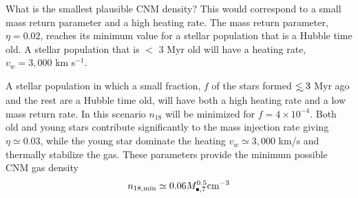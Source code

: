 \documentclass[usenatbib,fleqn]{mnras}
\newcommand\lsim{\mathrel{\rlap{\lower4pt\hbox{\hskip1pt$\sim$}}
    \raise1pt\hbox{$<$}}}
\newcommand{\Mbh}[1][]{M_{\bullet#1}}
\begin{document}



What is the smallest plausible CNM density? This would correspond to a
small mass return parameter and a high heating rate. The mass return
parameter, $\eta=0.02$, reaches its minimum value for a stellar
population that is a Hubble time old. A stellar population
that is $<$ 3 Myr old will have a heating rate, $v_w=3,000$ km s$^{-1}$.

A stellar population in which a small fraction, $f$ of the stars
formed $\lsim 3$ Myr ago and the rest are a Hubble time old, will have
both a high heating rate and a low mass return rate. In this scenario
$n_{18}$ will be minimized for $f=4\times 10^{-4}$. Both old and young
stars contribute significantly to the mass injection rate giving
$\eta\simeq 0.03$, while the young star dominate the heating
$v_w\simeq 3,000$ km/s and thermally stabilize the gas. These
parameters provide the minimum possible CNM gas density
\begin{equation}
n_{\rm 18,min}\simeq 0.06 \Mbh[,7]^{0.5} {\rm cm^{-3}}
\label{eq:n18min}
\end{equation}
\end{document}

